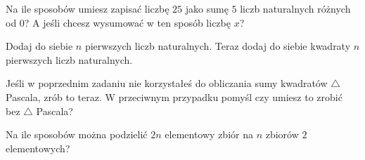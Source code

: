 \documentclass{../uoom}
\begin{document}
\begin{zadanie}
  Na ile sposobów umiesz zapisać liczbę $25$ jako sumę $5$ liczb naturalnych różnych od $0$? A jeśli chcesz wysumować w ten sposób liczbę $x$? 
\end{zadanie}
  
\begin{zadanie}
  Dodaj do siebie $n$ pierwszych liczb naturalnych. Teraz dodaj do siebie kwadraty $n$ pierwszych liczb naturalnych. 
\end{zadanie}


\begin{zadanie}
  Jeśli w poprzednim zadaniu nie korzystałeś do obliczania sumy kwadratów $\triangle$ Pascala, zrób to teraz. W przeciwnym przypadku pomyśl czy umiesz to zrobić bez $\triangle$ Pascala?
\end{zadanie}

\begin{zadanie}
  Na ile sposobów można podzielić $2n$ elementowy zbiór na $n$ zbiorów $2$ elementowych? %
\end{zadanie}
\end{document}
